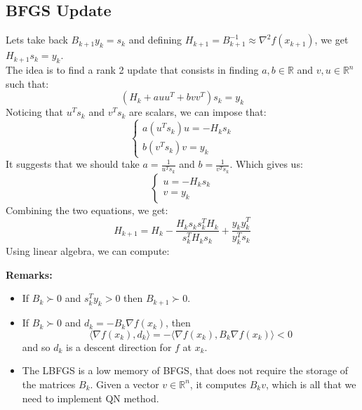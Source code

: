 \documentclass[12pt, openany]{report}
\newcommand{\R}{\mathbb{R}}
\theoremstyle{definition}
\begin{document}
\subsection{BFGS Update}
Lets take back $B_{k+1} y_k = s_k$ and defining $H_{k+1} = B_{k+1}^{-1} \approx \nabla^2 f(x_{k+1})$, we get $H_{k+1} s_k = y_k$.\\
The idea is to find a rank 2 update that consists in finding $a,b \in \R$ and $v,u \in \R^n$ such that:
\begin{equation}\label{eq:rank2_update_idea}
	\left(H_k + a uu^T + b vv^T\right)s_k = y_k
\end{equation}
Noticing that $u^Ts_k$ and $v^Ts_k$ are scalars, we can impose that:
\begin{equation}
	\begin{cases}
		a(u^Ts_k) u = -H_ks_k\\
		b(v^Ts_k) v = y_k
	\end{cases}
\end{equation}
It suggests that we should take $a= \frac{1}{u^Ts_k}$ and $b = \frac{1}{v^Ts_k}$. Which gives us:
\begin{equation}
	\begin{cases}
		u = -H_ks_k\\
		v = y_k
	\end{cases}
\end{equation}
Combining the two equations, we get:
\begin{equation}
	H_{k+1} = H_k - \frac{H_ks_ks_k^TH_k}{s_k^TH_ks_k} + \frac{y_ky_k^T}{y_k^Ts_k}
\end{equation}
Using linear algebra, we can compute:\\
\begin{center}
	\color{red}
	\color{black}
\end{center}
\textbf{Remarks:}
\begin{itemize}
	\item If $B_k \succ 0$ and $s_k^Ty_k > 0$ then $B_{k+1} \succ 0$.
	\item If $B_k \succ 0$ and $d_k = - B_k \nabla f(x_k)$, then 
	\begin{equation}
		\langle \nabla f(x_k), d_k \rangle = - \langle \nabla f(x_k), B_k \nabla f(x_k) \rangle < 0
	\end{equation}
	and so $d_k$ is a descent direction for $f$ at $x_k$.
	\item The LBFGS is a low memory of BFGS, that does not require the storage of the matrices $B_k$. Given a vector $v \in \R^n$, it computes $B_kv$, which is all that we need to implement QN method.
\end{itemize}
\end{document}
